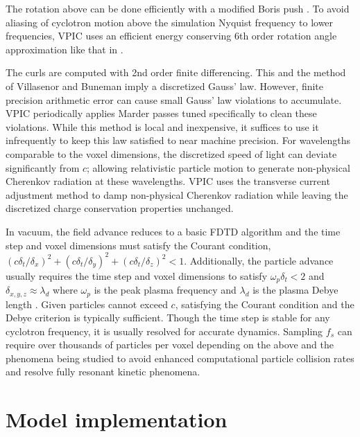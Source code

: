 \documentclass[10pt]{article}
\begin{document}
The rotation above can be done efficiently with a modified Boris push
\cite{Boris_1970}.  To avoid aliasing of cyclotron motion above the
simulation Nyquist frequency to lower frequencies, VPIC uses an
efficient energy conserving 6th order rotation angle approximation
like that in \cite{Blahovec_et_al_2000}.

The curls are computed with 2nd order finite differencing.  This and
the method of Villasenor and Buneman imply a discretized Gauss' law.
However, finite precision arithmetic error can cause small Gauss' law
violations to accumulate.  VPIC periodically applies Marder passes
\cite{Marder_1987} tuned specifically to clean these violations.
While this method is local and inexpensive, it suffices to use it
infrequently to keep this law satisfied to near machine precision.
For wavelengths comparable to the voxel dimensions, the discretized
speed of light can deviate significantly from $c$; allowing
relativistic particle motion to generate non-physical Cherenkov
radiation at these wavelengths.  VPIC uses the transverse current
adjustment method \cite{Eastwood_et_al_1995} to damp non-physical
Cherenkov radiation while leaving the discretized charge conservation
properties unchanged.

In vacuum, the field advance reduces to a basic FDTD algorithm
\cite{Yee_1966} and the time step and voxel dimensions must satisfy the
Courant condition,
$\left(c\delta_t/\delta_x\right)^2 +
 \left(c\delta_t/\delta_y\right)^2 +
 \left(c\delta_t/\delta_z\right)^2 < 1$.
Additionally, the particle advance usually requires the time
step and voxel dimensions to satisfy $\omega_p \delta_t < 2$ and
$\delta_{x,y,z}
\approx \lambda_d$ where $\omega_p$ is the peak plasma frequency and
$\lambda_d$ is the plasma Debye length
\cite{Birdsall_Langdon_1985,Hockney_Eastwood_1988}.
Given particles cannot exceed $c$, satisfying the Courant condition
and the Debye criterion is typically sufficient.  Though the time step
is stable for any cyclotron frequency, it is usually resolved for
accurate dynamics.  Sampling $f_s$ can require over thousands of
particles per voxel depending on the above and the phenomena being
studied to avoid enhanced computational particle collision rates and
resolve fully resonant kinetic phenomena.

\section{Model implementation}
\end{document}
